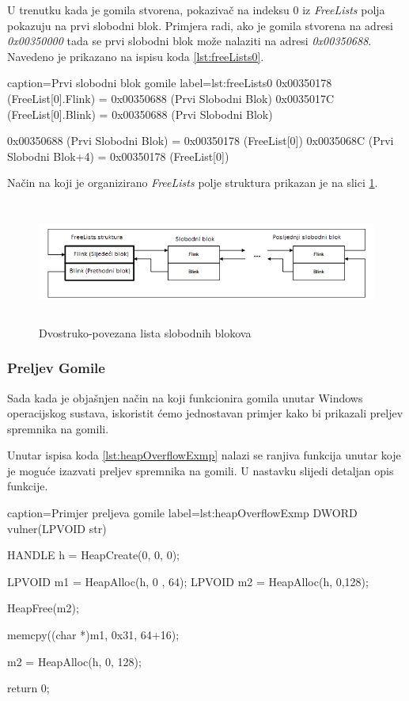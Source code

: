 \documentclass[times, utf8, diplomski, numeric]{fer}
\begin{document}
U trenutku kada je gomila stvorena, pokazivač na indeksu 0 iz
\emph{FreeLists} polja pokazuju na prvi slobodni blok. Primjera
radi, ako je gomila stvorena na adresi \emph{0x00350000} tada se
prvi slobodni blok može nalaziti na adresi \emph{0x00350688}.
Navedeno je prikazano na ispisu koda \ref{lst:freeLists0}.

\begin{ispis} {caption=Prvi slobodni blok gomile} {label=lst:freeLists0}
0x00350178 (FreeList[0].Flink) = 0x00350688 (Prvi Slobodni Blok)
0x0035017C (FreeList[0].Blink) = 0x00350688 (Prvi Slobodni Blok)

0x00350688 (Prvi Slobodni Blok) = 0x00350178 (FreeList[0])
0x0035068C (Prvi Slobodni Blok+4) = 0x00350178 (FreeList[0])
\end{ispis}

Način na koji je organizirano \emph{FreeLists} polje struktura
prikazan je na slici \ref{fig:free_lists_entries}.

\begin{figure}[!ht]
\centering
\setlength\fboxsep{0pt}
\setlength\fboxrule{0.5pt}
\includegraphics[width=15cm, height=4cm]{slike/free_lists_entries}
\caption{Dvostruko-povezana lista slobodnih blokova}
\label{fig:free_lists_entries} 
\end{figure}

\subsubsection{Preljev Gomile}

Sada kada je objašnjen način na koji funkcionira gomila unutar
Windows operacijskog sustava, iskoristit ćemo jednostavan primjer
kako bi prikazali preljev spremnika na gomili.

Unutar ispisa koda \ref{lst:heapOverflowExmp} nalazi se ranjiva
funkcija unutar koje je moguće izazvati preljev spremnika na
gomili. U nastavku slijedi detaljan opis funkcije.

\begin{ispis} {caption=Primjer preljeva gomile} {label=lst:heapOverflowExmp}
DWORD vulner(LPVOID str)
{
    HANDLE h = HeapCreate(0, 0, 0);
 
    LPVOID m1 = HeapAlloc(h, 0 , 64);
    LPVOID m2 = HeapAlloc(h, 0,128);
 
    HeapFree(m2);

    memcpy((char *)m1, 0x31, 64+16);
 
    m2 = HeapAlloc(h, 0, 128);
 
    return 0;
}
\end{ispis}
\end{document}
